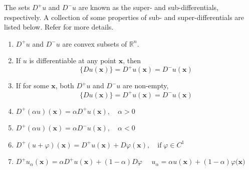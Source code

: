 \noindent
The sets $D^+u$ and $D^-u$ are known as the super- and
sub-differentials, respectively. A collection of some properties of
sub- and super-differentials are listed below. Refer \cite{yong} for more
details.
\begin{enumerate}
\item $D^+u$ and $D^-u$ are convex subsets of $\mathbb{R}^n$.
\item If $u$ is differentiable at any point $\mathbf{x}$, then
  \begin{equation}\nonumber
    \{Du(\mathbf{x})\} = D^+u(\mathbf{x}) = D^-u(\mathbf{x})
  \end{equation}
\item If for some $\mathbf{x}$, both $D^+u$ and $D^-u$ are non-empty,
  \begin{equation}\nonumber
    \{Du(\mathbf{x})\} = D^+u(\mathbf{x}) = D^-u(\mathbf{x})
  \end{equation}
\item
  $D^+(\alpha u)(\mathbf{x}) = \alpha D^+u(\mathbf{x}), \quad \alpha >
  0$
\item
  $D^+(\alpha u)(\mathbf{x}) = \alpha D^-u(\mathbf{x}), \quad \alpha <
  0$
\item
  $D^+(u+\varphi)(\mathbf{x}) = D^+u(\mathbf{x}) +
  D\varphi(\mathbf{x}), \quad \text{if} \;\varphi \in C^1$
\item
  $D^+u_\alpha(\mathbf{x}) = \alpha D^+u(\mathbf{x}) +
  (1-\alpha)D\varphi\nonumber$ \hspace{5mm} 
  $\quad u_\alpha = \alpha u(\mathbf{x}) +
  (1-\alpha)\varphi(\mathbf{x)}\nonumber$
\end{enumerate}

